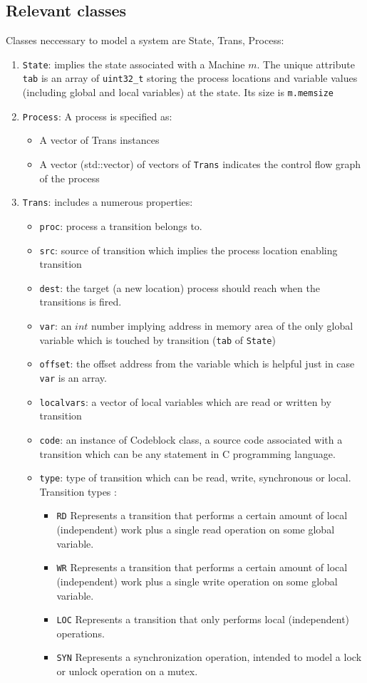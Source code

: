 \documentclass{llncs}
\begin{document}
\subsection{Relevant classes}
Classes neccessary to model a system are State, Trans, Process:
\begin{enumerate}
\item
	\verb!State!: implies the state associated with a Machine $m$. The unique attribute \verb!tab! is an array of \verb!uint32_t! storing the process locations and variable values (including global and local variables) at the state. Its size is \verb!m.memsize!
\item
	\verb!Process!: A process is specified as:
	\begin{itemize}
	\item
		A vector of Trans instances
	\item
		A vector (std::vector) of vectors of \verb!Trans! indicates the control flow graph of the process
	\end{itemize}	 
\item
	\verb!Trans!: includes a numerous properties:
	\begin{itemize}
	\item
		\verb!proc!: process a transition belongs to.
	\item
		\verb!src!: source of transition which implies the process location enabling transition
	\item
		\verb!dest!: the target (a new location) process should reach when the transitions is fired.
	\item
		\verb!var!: an $int$ number implying address in memory area of the only global variable which is touched by transition (\verb!tab! of \verb!State!)
	\item
		\verb!offset!: the offset address from the variable which is helpful just in case \verb!var! is an array.
	\item
		\verb!localvars!: a vector of local variables which are read or written by transition
	\item
		\verb!code!: an instance of Codeblock class, a source code associated with a transition which can be any statement in C
		 programming language.
	\item
		\verb!type!: type of transition which can be read, write, synchronous or local. 
		Transition types :
		\begin{itemize}
		\item
			\verb!RD! Represents a transition that performs a certain amount of local (independent) work plus a single read
			 operation on some global variable.
		\item
			\verb!WR! Represents a transition that performs a certain amount of local (independent) work plus a single write
			 operation on some global variable.
		\item
			\verb!LOC! Represents a transition that only performs local (independent) operations.
		\item
			\verb!SYN! Represents a synchronization operation, intended to model a lock or unlock operation on a mutex.
		\end{itemize}
		

\end{itemize}
\end{enumerate}
\end{document}
